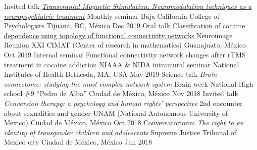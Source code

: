 \begin{cvproceedings}
    \cvproceeding
        {Invited talk}
        {\href{https://soffiafdz.github.io/slides/EMTr.html}{\textit{Transcranial
        Magnetic Stimulation: Neuromodulation techniques as a neuropsychiatric
  treatment}}}
        {Monthly seminar}
        {Baja California College of Psychologists}
        {Tijuana, BC, México}
        {Dec 2019}
    \cvproceeding
        {Oral talk}
        {\href{https://soffiafdz.github.io/slides/neuroimagenXXI.html}{Classification of cocaine dependence using topology of functional connectivity networks}}
        {Neuroimage Reunion XXI}
        {CIMAT (Center of research in mathematics)}
        {Guanajuato, México}
        {Oct 2019}
    \cvproceeding
        {Internal seminar}
        {Functional connectivity network changes after rTMS treatment in
        cocaine addiction}
        {NIAAA \& NIDA intramural seminar}
        {National Institutes of Health}
        {Bethesda, MA, USA}
        {May 2019}
    \cvproceeding
        {Science talk}
        {\textit{Brain connectome: studying the most complex network system}
        }
        {Brain week}
        {National High school \#9 ``Pedro de Alba''}
        {Ciudad de México, México}
        {Nov 2018}
    \cvproceeding
        {Invited talk}
        {\textit{Conversion therapy: a psychology and human rights' perspective}
        }
        {2nd encounter about sexualities and gender}
        {UNAM (National Autonomous University of Mexico)}
        {Ciudad de México, México}
        {Oct 2018}
    \cvproceeding
        {Conversatorioum}
        {\textit{The right to an identity of transgender children and adolescents}
        }
        {}
        {Supreme Justice Tribunal of Mexico city}
        {Ciudad de México, México}
        {Jun 2018}
\end{cvproceedings}
